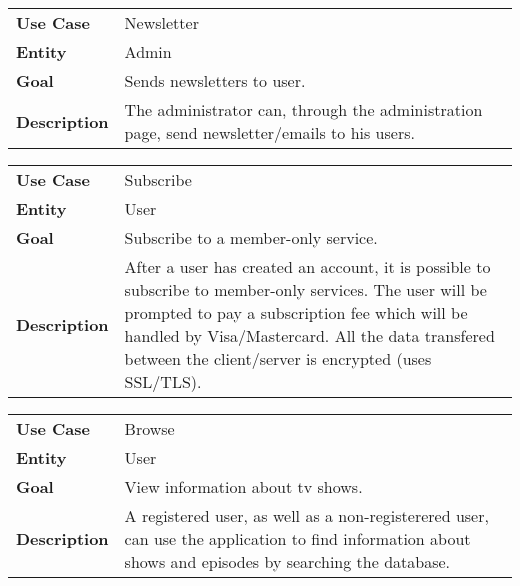 \begin{framed}
\begin{tabular}{ l p{11cm}}
  \textbf{Use Case} & Newsletter \\
  \textbf{Entity} & Admin \\
  \textbf{Goal} & Sends newsletters to user. \\
  \textbf{Description} & The administrator can, through the administration page, send newsletter/emails to his users. \\
\end{tabular}
\end{framed}

\begin{framed}
\begin{tabular}{ l p{11cm}}
  \textbf{Use Case} & Subscribe \\
  \textbf{Entity} & User \\
  \textbf{Goal} & Subscribe to a member-only service.\\
  \textbf{Description} & After a user has created an account, it is possible to subscribe to member-only services. The user will be prompted to pay a subscription fee which will be handled by Visa/Mastercard. All the data transfered between the client/server is encrypted (uses SSL/TLS). \\
\end{tabular}
\end{framed}

\begin{framed}
\begin{tabular}{ l p{11cm}}
  \textbf{Use Case} & Browse \\
  \textbf{Entity} & User \\
  \textbf{Goal} & View information about tv shows.\\
  \textbf{Description} & A registered user, as well as a non-registerered user, can use the application to find information about shows and episodes by searching the database. \\
\end{tabular}
\end{framed}